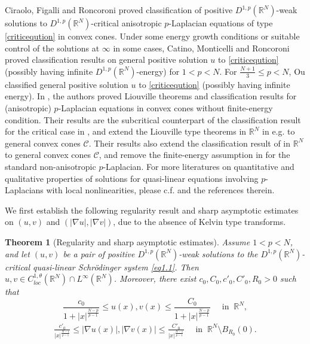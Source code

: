 \documentclass[12pt]{amsart}
\newtheorem{thm}{Theorem}[section]
\theoremstyle{definition}
\theoremstyle{remark}
\theoremstyle{conclusion}
\theoremstyle{conjecture}
\numberwithin{equation}{section}
\newcommand{\R}{\mathbb{R}}
\begin{document}
\smallskip

Ciraolo, Figalli and Roncoroni \cite{CFR} proved classification of positive $D^{1,p}(\R^N)$-weak solutions to $D^{1,p}(\R^N)$-critical anisotropic $p$-Laplacian equations of type \eqref{criticeqution} in convex cones. Under some energy growth conditions or suitable control of the solutions at $\infty$ in some cases, Catino, Monticelli and Roncoroni \cite{CMR} proved classification results on general positive solution $u$ to \eqref{criticeqution} (possibly having infinite $D^{1,p}(\R^N)$-energy) for $1<p<N$. For $\frac{N+1}{3}\leq p<N$, Ou \cite{Ou} classified general positive solution $u$ to \eqref{criticeqution} (possibly having infinite energy). In \cite{CDGL}, the authors proved Liouville theorems and classification results for (anisotropic) $p$-Laplacian equations in convex cones without finite-energy condition. Their results are the subcritical counterpart of the classification result for the critical case in \cite{CFR}, and extend the Liouville type theorems in $\mathbb{R}^{N}$ in e.g. \cite{SJZH02} to general convex cones $\mathcal{C}$. Their results also extend the classification result of \cite{Ou} in $\mathbb{R}^{N}$ to general convex cones $\mathcal{C}$, and remove the finite-energy assumption in \cite{CFR} for the standard non-anisotropic $p$-Laplacian. For more literatures on quantitative and qualitative properties of solutions for quasi-linear equations involving $p$-Laplacians with local nonlinearities, please c.f. \cite{ACP,A,B,CDPSYS,CMR,CV,DDGL,LD,DFSV,DP,LDBS04,LDBS,DDH,DYZ,ED83,Di,FSV,GL,LPLDHT,Lieberman,OSV,BSR14,JSLB,SJZH02,Tei,PT,JLV,ZL} and the references therein.

\medskip

We first establish the following regularity result and sharp asymptotic estimates on $(u,v)$ and $(|\nabla u|,|\nabla v|)$, due to the absence of Kelvin type transforms.
\begin{thm}
[Regularity and sharp asymptotic estimates]\label{th2.1-}
Assume $1<p<N$, and let $(u,v)$ be a pair of positive $D^{1,p}(\R^{N})$-weak solutions to the $D^{1,p}(\mathbb{R}^{N})$-critical quasi-linear Schr\"{o}dinger system \eqref{eq1.1}. Then $u, v \in C_{loc}^{1,\theta} (\R^N) \cap L^\infty(\R^N)$. Moreover, there exist $c_0, C_0,c'_0, C'_0, R_0 > 0$ such that
\begin{equation}\label{eq0806}
  \frac{c_0}{1+|x|^\frac{N-p}{p-1}} \leq u(x) , v(x) \leq \frac{C_0}{1+|x|^\frac{N-p}{p-1}} \,\,\,\,\,\,\,\,\mbox{in}\,\,\ \R^N,
\end{equation}
\begin{align}\label{eq0806+}
   \frac{c'_0}{|x|^\frac{N-1}{p-1}} \leq |\nabla u(x)|, |\nabla v(x)|\leq \frac{C'_0}{|x|^\frac{N-1}{p-1}} \,\,\,\,\,\,\,\,\mbox{in}\,\,\ \R^N\setminus B_{R_0}(0).
\end{align}
\end{thm}
\end{document}
